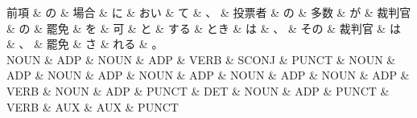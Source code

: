 \documentclass[tikz,border=5pt]{standalone}
\begin{document}
\normalsize
\begin{dependency}[edge unit distance=10.9pt]
    \begin{deptext}[column sep=1em]
        前項 \& の \& 場合 \& に \& おい \& て \& 、 \& 投票者 \& の \& 多数 \& が \& 裁判官 \& の \& 罷免 \& を \& 可 \& と \& する \& とき \& は \& 、 \& その \& 裁判官 \& は \& 、 \& 罷免 \& さ \& れる \& 。\\
        NOUN \& ADP \& NOUN \& ADP \& VERB \& SCONJ \& PUNCT \& NOUN \& ADP \& NOUN \& ADP \& NOUN \& ADP \& NOUN \& ADP \& NOUN \& ADP \& VERB \& NOUN \& ADP \& PUNCT \& DET \& NOUN \& ADP \& PUNCT \& VERB \& AUX \& AUX \& PUNCT\\
    \end{deptext}
\end{dependency}
\end{document}
